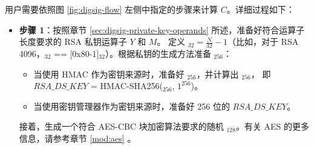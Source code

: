 \documentclass[main\_\_CN.tex]{subfiles}
\begin{document}
用户需要依照图 \ref{fig:digsig-flow} 左侧中指定的步骤来计算 \begin{math}C\end{math}。详细过程如下：

\begin{itemize}

    \item {\bfseries 步骤 1}：按照章节 \ref{sec:digsig-private-key-operands} 所述，准备好符合运算子长度要求的 RSA 私钥运算子 \begin{math}Y\end{math} 和 \begin{math}M\end{math}。
          定义 \begin{math}[L]_{32} = \frac{N}{32}-1 \end{math}（比如，对于 RSA 4096，\begin{math}[L]_{32}\end{math} == [0x80-1]\begin{math}_{32}\end{math}）。根据私钥的生成方法准备 \begin{math}[RSA\_DS\_KEY]_{256}\end{math}：
          \begin{itemize}
              \item 当使用 HMAC 作为密钥来源时，准备好 \begin{math}[HMAC\_KEY]_{256}\end{math}，并计算出 \begin{math}[RSA\_DS\_KEY]_{256}\end{math}， 即 \begin{math}RSA\_DS\_KEY\end{math} = HMAC-SHA256(\begin{math}[HMAC\_KEY]_{256}\end{math}, \begin{math}1^{256}\end{math})。
              \item 当使用密钥管理器作为密钥来源时，准备好 256 位的 \begin{math}RSA\_DS\_KEY\end{math}。
          \end{itemize}
          接着，生成一个符合 AES-CBC 块加密算法要求的随机 \begin{math}[IV]_{128}\end{math}。有关 AES 的更多信息，请参考章节 \ref{mod:aes} \textit{}。


\end{itemize}
\end{document}
